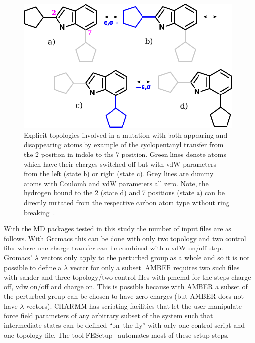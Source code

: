 \documentclass[journal=jctcce,manuscript=suppinfo]{achemso}
\begin{document}
\begin{figure}[ht]
\includegraphics[scale=1.0]{figures/dummies2.pdf}
\caption{Explicit topologies involved in a mutation with both
  appearing and disappearing atoms by example of the cyclopentanyl
  transfer from the 2 position in indole to the 7 position.  Green
  lines denote atoms which have their charges switched off but with
  vdW parameters from the left (state b) or right (state c). Grey
  lines are dummy atoms with Coulomb and vdW parameters all zero.
  Note, the hydrogen bound to the 2 (state d) and 7 positions (state
  a) can be directly mutated from the respective carbon atom type
  without ring breaking~\cite{doi:10.1021/acs.jcim.5b00057}.}
\label{fig:dummies2}
\end{figure}

With the MD packages tested in this study the number of input files
are as follows.  With Gromacs this can be done with only two topology
and two control files where one charge transfer can be combined with a
vdW on/off step.  Gromacs' $\lambda$ vectors only apply to the
perturbed group as a whole and so it is not possible to define a
$\lambda$ vector for only a subset.  AMBER requires two such files
with sander and three topology/two control files with pmemd for the
steps charge off, vdw on/off and charge on.  This is possible because
with AMBER a subset of the perturbed group can be chosen to have zero
charges (but AMBER does not have $\lambda$ vectors).  CHARMM has
scripting facilities that let the user manipulate force field
parameters of any arbitrary subset of the system such that
intermediate states can be defined ``on--the-fly'' with only one
control script and one topology file.  The tool
FESetup~\cite{loeffler_fesetup:_2015} automates most of these setup
steps.
\end{document}
